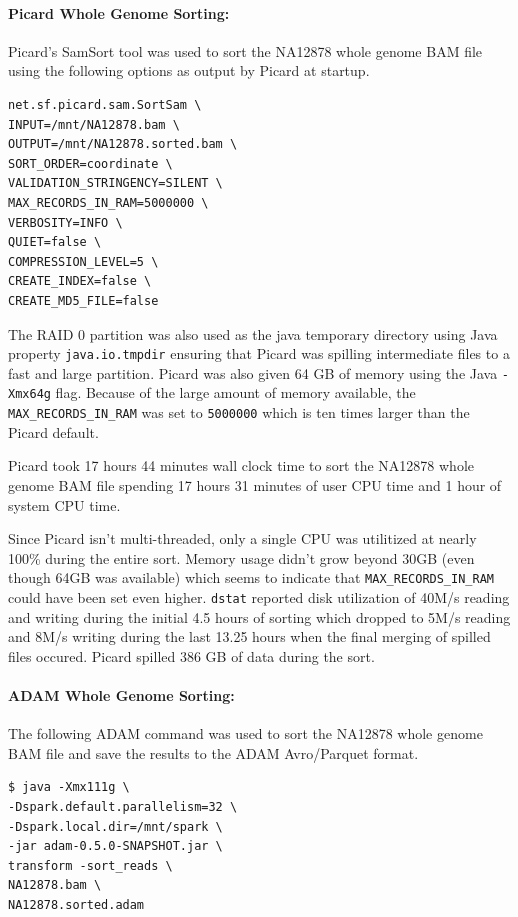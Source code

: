 \documentclass[10pt,twocolumn]{article}
\theoremstyle{plain}
\begin{document}
\paragraph{Picard Whole Genome Sorting:}
\label{sec:single-sort-picard}

Picard's SamSort tool was used to sort the NA12878 whole genome BAM file using the following options as output
by Picard at startup.

\begin{lstlisting}
net.sf.picard.sam.SortSam \
INPUT=/mnt/NA12878.bam \
OUTPUT=/mnt/NA12878.sorted.bam \
SORT_ORDER=coordinate \
VALIDATION_STRINGENCY=SILENT \
MAX_RECORDS_IN_RAM=5000000 \
VERBOSITY=INFO \
QUIET=false \
COMPRESSION_LEVEL=5 \
CREATE_INDEX=false \
CREATE_MD5_FILE=false
\end{lstlisting}

The RAID 0 partition was also used as the java temporary directory using Java property
\texttt{java.io.tmpdir} ensuring that Picard was spilling intermediate files to a fast and large partition.
Picard was also given 64 GB of memory using the Java \texttt{-Xmx64g} flag. Because of the large amount of memory available,
the \texttt{MAX\_RECORDS\_IN\_RAM} was set to \texttt{5000000} which is ten times larger than the Picard default.

Picard took 17 hours 44 minutes wall clock time to sort the NA12878 whole genome BAM file spending 17 hours 31 minutes of user CPU time and
1 hour of system CPU time.

Since Picard isn't multi-threaded, only a
single CPU was utilitized at nearly 100\% during the entire sort. Memory usage didn't grow beyond 30GB (even
though 64GB was available) which seems to indicate that \texttt{MAX\_RECORDS\_IN\_RAM} could have been set even higher.
\texttt{dstat} reported disk utilization of 40M/s reading and writing during the initial 4.5 hours of sorting which
dropped to 5M/s reading and 8M/s writing during the last 13.25 hours when the final merging of spilled files occured.
Picard spilled 386 GB of data during the sort.

\paragraph{ADAM Whole Genome Sorting:}
\label{sec:single-sort-adam}

The following ADAM command was used to sort the NA12878 whole genome BAM file and save the results to the 
ADAM Avro/Parquet format.

\begin{lstlisting}
$ java -Xmx111g \
-Dspark.default.parallelism=32 \
-Dspark.local.dir=/mnt/spark \
-jar adam-0.5.0-SNAPSHOT.jar \
transform -sort_reads \
NA12878.bam \
NA12878.sorted.adam
\end{lstlisting}
\end{document}
